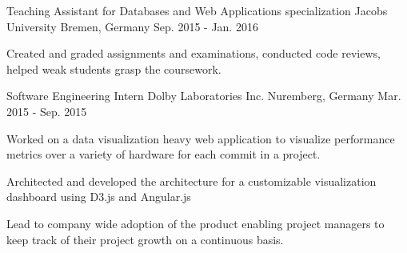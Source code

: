 \begin{cventries}
{\begin{cvitems}
    \end{cvitems} 
  }
\cventry
  {Teaching Assistant for Databases and Web Applications specialization} %
  {Jacobs University} %
  {Bremen, Germany} %
  {Sep. 2015 - Jan. 2016} %
  {
    \begin{cvitems} %
      \item {Created and graded assignments and examinations, conducted code reviews, helped weak students grasp the coursework.}
    \end{cvitems} 
  }
  \cventry
    {Software Engineering Intern} %
    {Dolby Laboratories Inc.} %
    {Nuremberg, Germany} %
    {Mar. 2015 - Sep. 2015} %
    {
      \begin{cvitems} %
        \item {Worked on a data visualization heavy web application to visualize performance metrics over a variety of hardware for each commit in a project.}
        \item {Architected and developed the architecture for a customizable visualization dashboard using D3.js and Angular.js}
        \item {Lead to company wide adoption of the product enabling project managers to keep track of their project growth on a continuous basis.}
      \end{cvitems}
    }

\end{cventries}

